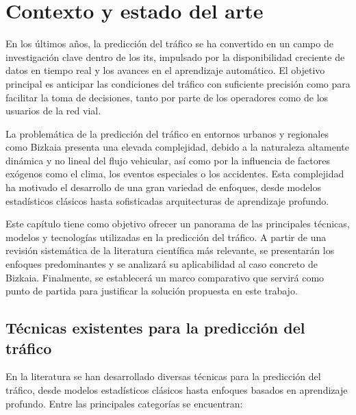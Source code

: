 \section{Contexto y estado del arte}
\label{sec:ctx_estart}

En los últimos años, la predicción del tráfico se ha convertido en un campo de investigación clave dentro de los \acrlong{its}, impulsado por la disponibilidad creciente de datos en tiempo real y los avances en el aprendizaje automático. El objetivo principal es anticipar las condiciones del tráfico con suficiente precisión como para facilitar la toma de decisiones, tanto por parte de los operadores como de los usuarios de la red vial.

La problemática de la predicción del tráfico en entornos urbanos y regionales como Bizkaia presenta una elevada complejidad, debido a la naturaleza altamente dinámica y no lineal del flujo vehicular, así como por la influencia de factores exógenos como el clima, los eventos especiales o los accidentes. Esta complejidad ha motivado el desarrollo de una gran variedad de enfoques, desde modelos estadísticos clásicos hasta sofisticadas arquitecturas de aprendizaje profundo.

Este capítulo tiene como objetivo ofrecer un panorama de las principales técnicas, modelos y tecnologías utilizadas en la predicción del tráfico. A partir de una revisión sistemática de la literatura científica más relevante, se presentarán los enfoques predominantes y se analizará su aplicabilidad al caso concreto de Bizkaia. Finalmente, se establecerá un marco comparativo que servirá como punto de partida para justificar la solución propuesta en este trabajo.

\subsection{Técnicas existentes para la predicción del tráfico}

En la literatura se han desarrollado diversas técnicas para la predicción del tráfico, desde modelos estadísticos clásicos hasta enfoques basados en aprendizaje profundo. Entre las principales categorías se encuentran:

